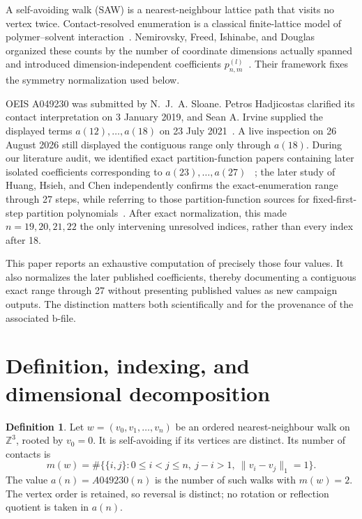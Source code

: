 \documentclass[11pt]{article}
\theoremstyle{definition}
\newtheorem{definition}[theorem]{Definition}
\theoremstyle{remark}
\begin{document}
A self-avoiding walk (SAW) is a nearest-neighbour lattice path that visits no
vertex twice.  Contact-resolved enumeration is a classical finite-lattice model
of polymer--solvent interaction~\cite{FisherHiley1961}.  Nemirovsky, Freed,
Ishinabe, and Douglas organized these counts by the number of coordinate
dimensions actually spanned and introduced dimension-independent coefficients
$p_{n,m}^{(l)}$~\cite{NemirovskyEtAl1992}.  Their framework fixes the symmetry
normalization used below.

OEIS A049230 was submitted by N.~J.~A. Sloane.  Petros Hadjicostas clarified
its contact interpretation on 3 January 2019, and Sean A. Irvine supplied the
displayed terms $a(12),\ldots,a(18)$ on 23 July 2021~\cite{OEISA049230}.  A
live inspection on 26 August 2026 still displayed the contiguous range only
through $a(18)$.  During our literature audit, we identified exact
partition-function papers containing later isolated coefficients corresponding
to $a(23),\ldots,a(27)$~
\cite{LeeEtAl2012,HsiehEtAl2016EPJ,HsiehEtAl2016CPC}; the later study of
Huang, Hsieh, and Chen independently confirms the exact-enumeration range
through 27 steps, while referring to those partition-function sources for
fixed-first-step partition polynomials~\cite{HuangEtAl2022}.  After exact
normalization, this made $n=19,20,21,22$ the only intervening unresolved
indices, rather than every index after 18.

This paper reports an exhaustive computation of precisely those four values.
It also normalizes the later published coefficients, thereby documenting a
contiguous exact range through 27 without presenting published values as new
campaign outputs.  The distinction matters both scientifically and for the
provenance of the associated b-file.

\section{Definition, indexing, and dimensional decomposition}

\begin{definition}
Let $w=(v_0,v_1,\ldots,v_n)$ be an ordered nearest-neighbour walk on
$\mathbb Z^3$, rooted by $v_0=0$.  It is self-avoiding if its vertices are
distinct.  Its number of contacts is
\[
 m(w)=\#\bigl\{\{i,j\}:0\leq i<j\leq n,\ j-i>1,
                   \ \lVert v_i-v_j\rVert_1=1\bigr\}.
\]
The value $a(n)=A049230(n)$ is the number of such walks with $m(w)=2$.
The vertex order is retained, so reversal is distinct; no rotation or
reflection quotient is taken in $a(n)$.
\end{definition}
\end{document}
